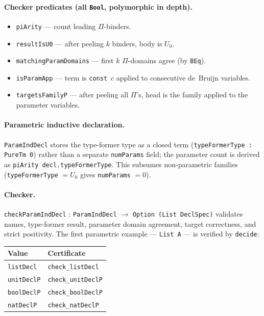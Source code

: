 \documentclass[11pt]{article}
\theoremstyle{remark}
\newcommand{\code}[1]{\texttt{#1}}
\newcommand{\leanref}[1]{\texttt{#1}}
\begin{document}
\paragraph{Checker predicates (all \leanref{Bool}, polymorphic in depth).}
\begin{itemize}[nosep]
  \item \leanref{piArity} --- count leading $\Pi$-binders.
  \item \leanref{resultIsU0} --- after peeling $k$ binders, body is $U_0$.
  \item \leanref{matchingParamDomains} --- first $k$ $\Pi$-domains agree
  (by \code{BEq}).
  \item \leanref{isParamApp} --- term is \code{const}~$c$ applied to
  consecutive de~Bruijn variables.
  \item \leanref{targetsFamilyP} --- after peeling all $\Pi$'s, head is the
  family applied to the parameter variables.
\end{itemize}

\paragraph{Parametric inductive declaration.}
\leanref{ParamIndDecl} stores the type-former type as a closed term
(\leanref{typeFormerType : PureTm 0}) rather than a separate \code{numParams}
field; the parameter count is derived as
\leanref{piArity decl.typeFormerType}.
This subsumes non-parametric families
(\leanref{typeFormerType} $= U_0$ gives \code{numParams} $= 0$).

\paragraph{Checker.}
\leanref{checkParamIndDecl} : \leanref{ParamIndDecl} $\to$
\leanref{Option (List DeclSpec)} validates names, type-former result, parameter
domain agreement, target correctness, and strict positivity.
The first parametric example --- \code{List A} --- is verified by
\code{decide}:

\begin{center}
\small
\begin{tabular}{@{}ll@{}}
\toprule
Value & Certificate \\
\midrule
\leanref{listDecl}   & \leanref{check\_listDecl} \\
\leanref{unitDeclP}  & \leanref{check\_unitDeclP} \\
\leanref{boolDeclP}  & \leanref{check\_boolDeclP} \\
\leanref{natDeclP}   & \leanref{check\_natDeclP} \\
\bottomrule
\end{tabular}
\end{center}
\end{document}
